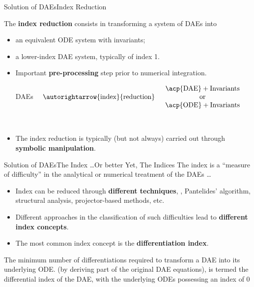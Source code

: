 \begin{frame}{Solution of \aclp{DAE}}{Index Reduction}
  \begin{bbox}
    The \textbf{index reduction} consists in transforming a system of \acp{DAE} into
    \begin{itemize}
      \item an equivalent \ac{ODE} system with invariants;
      \item a lower-index \ac{DAE} system, typically of index 1.
    \end{itemize}
  \end{bbox}
  \begin{itemize}
    \item Important \textbf{pre-processing} step prior to numerical integration.
    \begin{center}\begin{minipage}{7.5cm}\begin{bbox}{}
      \centering
      \acp{DAE} $\quad \autorightarrow{\text{index}}{\text{reduction}} \quad \begin{array}{c}
        \text{\acp{DAE}} + \text{Invariants} \\
        \text{or} \\
        \text{\acp{ODE}} + \text{Invariants}
      \end{array}$
    \end{bbox}\end{minipage} \\[1.5em] \end{center}
    \item The index reduction is typically (but not always) carried out through \textbf{symbolic manipulation}.
  \end{itemize}
\end{frame}

\begin{frame}{Solution of \aclp{DAE}}{The Index \dots Or better Yet, The Indices}
  The index is a ``measure of difficulty'' in the analytical or numerical treatment of the \acp{DAE} \dots
  \begin{itemize}
    \item Index can be reduced through \textbf{different techniques}, \eg{}, Pantelides' algorithm, structural analysis, projector-based methods, etc.
    \item Different approaches in the classification of such difficulties lead to \textbf{different index concepts}.
    \item The most common index concept is the \textbf{differentiation index}.
  \end{itemize}
  \begin{bbox}
    The minimum number of differentiations required to transform a \ac{DAE} into its underlying \ac{ODE}. (by deriving part of the original \ac{DAE} equations),    is termed the differential index of the \ac{DAE}, with the underlying \acp{ODE} possessing an index of 0
  \end{bbox}
\end{frame}

